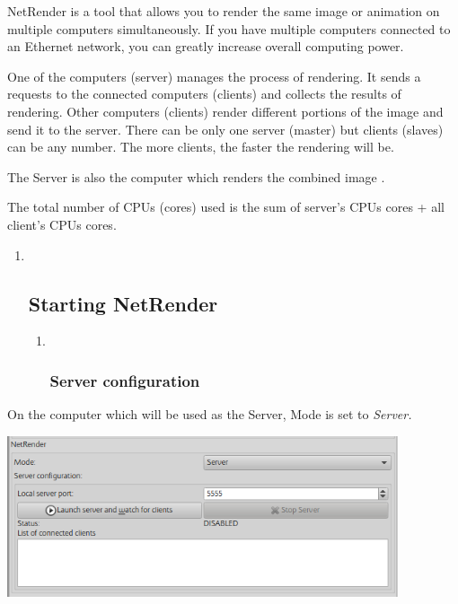 NetRender is a tool that allows you to render the same image or
animation on multiple computers simultaneously. If you have multiple
computers connected to an Ethernet network, you can greatly increase
overall computing power.

One of the computers (server) manages the process of rendering. It sends
a requests to the connected computers (clients) and collects the results
of rendering. Other computers (clients) render different portions of the
image and send it to the server. There can be only one server (master)
but clients (slaves) can be any number. The more clients, the faster the
rendering will be.

The Server is also the computer which renders the combined image .

The total number of CPUs (cores) used is the sum of server's CPUs cores
+ all client's CPUs cores.

\begin{enumerate}
\def\labelenumi{\arabic{enumi}.}
\item ~
  \hypertarget{starting-netrender}{\subsection{Starting
  NetRender}\label{starting-netrender}}

  \begin{enumerate}
  \def\labelenumii{\alph{enumii}.}
  \item ~
    \subsubsection{Server configuration}\label{server-configuration}
  \end{enumerate}
\end{enumerate}

On the computer which will be used as the Server, Mode is set to
\emph{Server.}

\includegraphics[width=4.53071in,height=1.86614in]{img/manual/media/image29.png}

